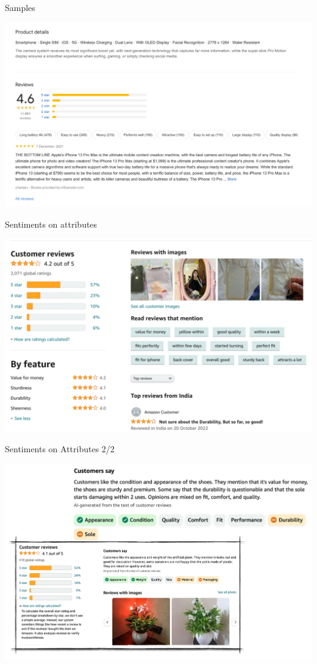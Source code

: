 \begin{frame}{Samples}
\begin{center}
\includegraphics[width=0.85\linewidth]{Images/SAExample1}
\end{center}

\end{frame}

\begin{frame}{Sentiments on attributes}
\begin{center}
\includegraphics[width=0.85\linewidth]{Images/SAExample2}
\end{center}

\end{frame}

\begin{frame}{Sentiments on Attributes 2/2}
\begin{center}
\includegraphics[width=0.85\linewidth]{Images/SAExample3}
\end{center}

\end{frame}


